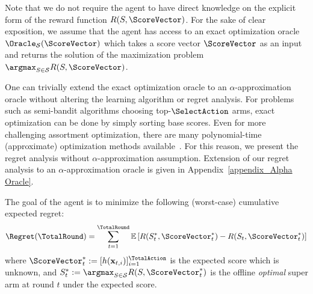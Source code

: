\documentclass{article}
\theoremstyle{plain}
\begin{document}
Note that we do not require the agent to have direct knowledge on the explicit form of the reward function $R(S, \ScoreVector)$.
For the sake of clear exposition, we assume that the agent has access to an exact optimization oracle $\Oracle_{\mathcal{S}}(\ScoreVector)$ which takes a score vector $\ScoreVector$ as an input and returns the solution of the maximization problem $\argmax_{S \in \mathcal{S}} R(S, \ScoreVector)$. 

\begin{remark} \label{remark_exact oracle}
One can trivially extend the exact optimization oracle to an $\alpha$-approximation oracle without altering the learning algorithm or regret analysis. For problems such as semi-bandit algorithms choosing top-$\SelectAction$ arms, exact optimization can be done by simply sorting base scores. Even for more challenging assortment optimization, there are many polynomial-time (approximate) optimization methods available~\cite{rusmevichientong2010dynamic, james2014assortment}. 
For this reason, we present the regret analysis without $\alpha$-approximation assumption.
Extension of our regret analysis to an $\alpha$-approximation oracle is given in Appendix~\ref{appendix_Alpha Oracle}.
\end{remark}

The goal of the agent is to minimize the following (worst-case) cumulative expected regret:
\begin{equation}\label{eq_expected cumulative regret}
    \Regret(\TotalRound) = \sum_{t=1}^{\TotalRound} \mathbb{E} \left[ R(S_t^*, \ScoreVector_t^*) - R(S_t, \ScoreVector_t^*) \right]
\end{equation}
where $\ScoreVector^*_t := [ h(\mathbf{x}_{t, i}) ]_{i=1}^{\TotalAction}$ is the expected score which is unknown, and $S_t^* := \argmax_{S \in \mathcal{S}} R (S, \ScoreVector_t^*)$ is the offline {\it optimal} super arm at round $t$ under the expected score. 

\end{document}
